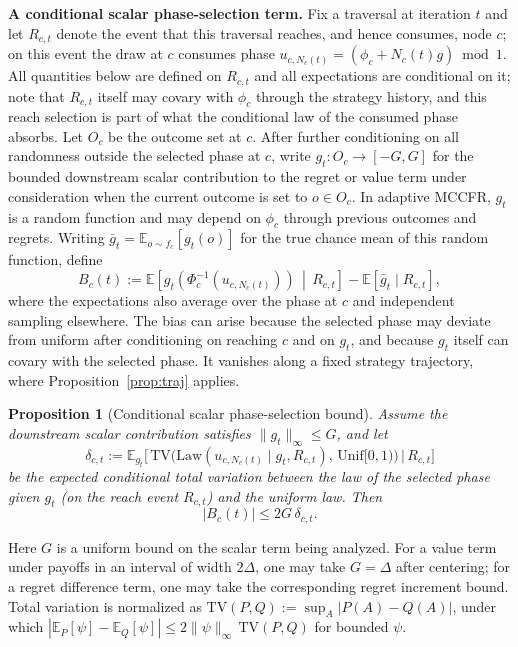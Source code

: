 \documentclass[11pt]{article}
\newtheorem{proposition}{Proposition}
\begin{document}
\textbf{A conditional scalar phase-selection term.} Fix a traversal at iteration $t$ and let $R_{c,t}$ denote the event that this traversal reaches, and hence consumes, node $c$; on this event the draw at $c$ consumes phase $u_{c,N_c(t)}=(\phi_c+N_c(t)g)\bmod 1$. All quantities below are defined on $R_{c,t}$ and all expectations are conditional on it; note that $R_{c,t}$ itself may covary with $\phi_c$ through the strategy history, and this reach selection is part of what the conditional law of the consumed phase absorbs. Let $O_c$ be the outcome set at $c$. After further conditioning on all randomness outside the selected phase at $c$, write $g_t:O_c\to[-G,G]$ for the bounded downstream scalar contribution to the regret or value term under consideration when the current outcome is set to $o\in O_c$. In adaptive MCCFR, $g_t$ is a random function and may depend on $\phi_c$ through previous outcomes and regrets. Writing $\bar g_t=\mathbb{E}_{o\sim f_c}[g_t(o)]$ for the true chance mean of this random function, define
\[
B_c(t):=\mathbb{E}\!\left[g_t\!\left(\Phi_c^{-1}(u_{c,N_c(t)})\right)\,\middle|\,R_{c,t}\right]-\mathbb{E}[\bar g_t\mid R_{c,t}],
\]
where the expectations also average over the phase at $c$ and independent sampling elsewhere. The bias can arise because the selected phase may deviate from uniform after conditioning on reaching $c$ and on $g_t$, and because $g_t$ itself can covary with the selected phase. It vanishes along a fixed strategy trajectory, where Proposition~\ref{prop:traj} applies.

\begin{proposition}[Conditional scalar phase-selection bound]
\label{prop:biasbound}
Assume the downstream scalar contribution satisfies $\|g_t\|_\infty\le G$, and let
\[
\delta_{c,t}:=\mathbb{E}_{g_t}\!\Big[\,\mathrm{TV}\!\big(\mathrm{Law}(u_{c,N_c(t)}\mid g_t,R_{c,t}),\,\mathrm{Unif}[0,1)\big)\,\Big|\,R_{c,t}\Big]
\]
be the expected \emph{conditional} total variation between the law of the selected phase given $g_t$ (on the reach event $R_{c,t}$) and the uniform law. Then
\[
|B_c(t)|\le 2G\,\delta_{c,t} .
\]
\end{proposition}
Here $G$ is a uniform bound on the scalar term being analyzed. For a value term under payoffs in an interval of width $2\Delta$, one may take $G=\Delta$ after centering; for a regret difference term, one may take the corresponding regret increment bound. Total variation is normalized as $\mathrm{TV}(P,Q):=\sup_{A}|P(A)-Q(A)|$, under which $|\mathbb{E}_P[\psi]-\mathbb{E}_Q[\psi]|\le 2\|\psi\|_\infty\,\mathrm{TV}(P,Q)$ for bounded $\psi$.
\end{document}
